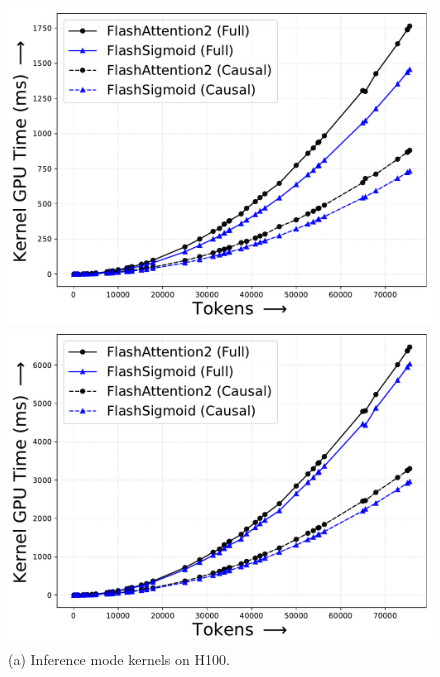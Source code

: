 \begin{figure}[!htbp]
    \centering
    \begin{minipage}{0.46\textwidth}
        \footnotesize
        \centering
        \includegraphics[trim={0 0 0 0}, width=\textwidth]{figures/_flash_figures/final_arxiv/f2/h100/H100_noalibi_FWD_Full_17.39_0.07_Causal_18.76_0.06.pdf}
        \captionsetup{justification=centering}
        \caption*{
            (a) Inference mode kernels on H100.
        }
    \end{minipage}
    \hfill
    \begin{minipage}{0.46\textwidth}
        \centering        
        \includegraphics[trim={0 0 0 0}, width=\textwidth]{figures/_flash_figures/final_arxiv/f2/h100/H100_noalibi_FWDBWD_Full_6.53_0.06_Causal_9.46_0.04.pdf}

\end{minipage}
\end{figure}
